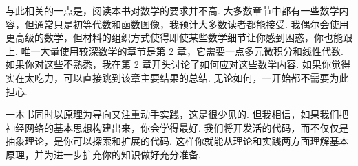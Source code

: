 与此相关的一点是，阅读本书对数学的要求并不高. 大多数章节中都有一些数学内容，但通常只是初等代数和函数图像，我预计大多数读者都能接受. 我偶尔会使用更高级的数学，但材料的组织方式使得即使某些数学细节让你感到困惑，你也能跟上. 唯一大量使用较深数学的章节是第 2 章，它需要一点多元微积分和线性代数. 如果你对这些不熟悉，我在第 2 章开头讨论了如何应对这些数学内容. 如果你觉得实在太吃力，可以直接跳到该章主要结果的总结. 无论如何，一开始都不需要为此担心.

一本书同时以原理为导向又注重动手实践，这是很少见的. 但我相信，如果我们把神经网络的基本思想构建出来，你会学得最好. 我们将开发活的代码，而不仅仅是抽象理论，是你可以探索和扩展的代码. 这样你就能从理论和实践两方面理解基本原理，并为进一步扩充你的知识做好充分准备.
